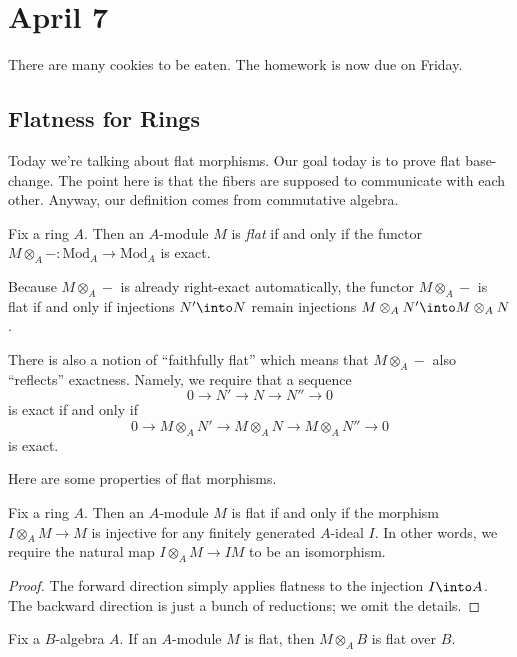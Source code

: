 \documentclass[../notes.tex]{subfiles}
\begin{document}
\section{April 7}

There are many cookies to be eaten. The homework is now due on Friday.

\subsection{Flatness for Rings}
Today we're talking about flat morphisms. Our goal today is to prove flat base-change. The point here is that the fibers are supposed to communicate with each other. Anyway, our definition comes from commutative algebra.
\begin{definition}[flat]
	Fix a ring $A$. Then an $A$-module $M$ is \textit{flat} if and only if the functor $M\otimes_A-\colon\mathrm{Mod}_A\to\mathrm{Mod}_A$ is exact.
\end{definition}
\begin{remark}
	Because $M\otimes_A-$ is already right-exact automatically, the functor $M\otimes_A-$ is flat if and only if injections $N'\into N$ remain injections $M\otimes_AN'\into M\otimes_AN$.
\end{remark}
\begin{remark}
	There is also a notion of ``faithfully flat'' which means that $M\otimes_A-$ also ``reflects'' exactness. Namely, we require that a sequence
	\[0\to N'\to N\to N''\to0\]
	is exact if and only if
	\[0\to M\otimes_AN'\to M\otimes_AN\to M\otimes_AN''\to0\]
	is exact.
\end{remark}
Here are some properties of flat morphisms.
\begin{lemma} \label{lem:flatness-by-ideals}
	Fix a ring $A$. Then an $A$-module $M$ is flat if and only if the morphism $I\otimes_AM\to M$ is injective for any finitely generated $A$-ideal $I$. In other words, we require the natural map $I\otimes_AM\to IM$ to be an isomorphism.
\end{lemma}
\begin{proof}
	The forward direction simply applies flatness to the injection $I\into A$. The backward direction is just a bunch of reductions; we omit the details.
\end{proof}
\begin{lemma} \label{lem:flat-base-extension}
	Fix a $B$-algebra $A$. If an $A$-module $M$ is flat, then $M\otimes_AB$ is flat over $B$.
\end{lemma}
\end{document}
